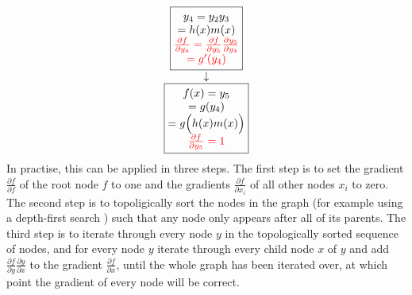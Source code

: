 \begin{equation*}
\begin{matrix}
\begin{matrix}
        \boxed{\begin{matrix}
            y_4 = y_2 y_3 \\
            = h(x) m(x) \\
            \color{red}{\frac{\partial f}{\partial y_4} = \frac{\partial f}{\partial y_5}\frac{\partial y_5}{\partial y_4}} \\
            \color{red}{= g'(y_4)}
        \end{matrix}} \\
        \downarrow \\
        \boxed{\begin{matrix}
            f(x) = y_5 \\
            = g(y_4) \\
            = g\Bigl(h(x) m(x)\Bigr) \\
            \color{red}{\frac{\partial f}{\partial y_5} = 1}
        \end{matrix}}
    \end{matrix}
    \end{matrix}
\end{equation*}
In practise, this can be applied in three steps. The first step is to set the gradient $\frac{\partial f}{\partial f}$ of the root node $f$ to one and the gradients $\frac{\partial f}{\partial x_i}$ of all other nodes $x_i$ to zero. The second step is to topoligically sort the nodes in the graph (for example using a depth-first search \cite{cormen2001section}) such that any node only appears after all of its parents. The third step is to iterate through every node $y$ in the topologically sorted sequence of nodes, and for every node $y$ iterate through every child node $x$ of $y$ and add $\frac{\partial f}{\partial y}\frac{\partial y}{\partial x}$ to the gradient $\frac{\partial f}{\partial x}$, until the whole graph has been iterated over, at which point the gradient of every node will be correct.

